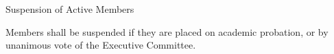 {
	\begin{article}{Suspension of Active Members}
		\item Members shall be suspended if they are placed on academic probation, or by unanimous vote of the Executive Committee.
	\end{article}
}